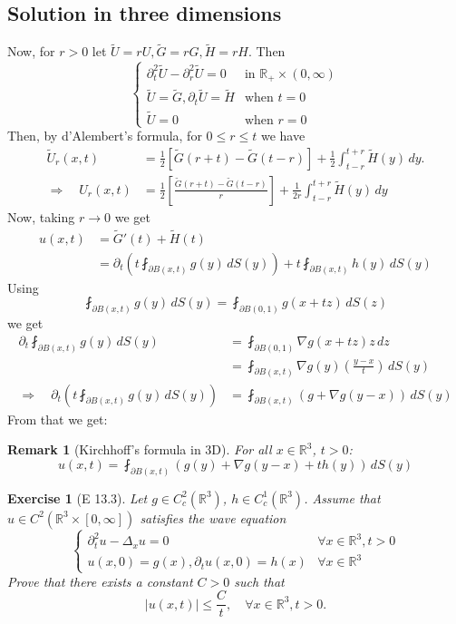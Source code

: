 \documentclass{report}
\theoremstyle{tommy}
\newtheorem{rem}[defn]{Remark}
\newtheorem{ex}[defn]{Exercise}
\begin{document}
  \subsection{Solution in three dimensions}
  Now, for \(r > 0\) let \(\tilde U = r U, \tilde G = rG, \tilde H = rH\). Then 
  \[\begin{cases}
    \partial_t^2 \tilde U - \partial_r^2 \tilde U = 0 & \text{in } \mathbb{R}_+ \times (0,\infty) \\
    \tilde U = \tilde G, \partial_t \tilde U = \tilde H &\text{when } t = 0 \\
    \tilde U = 0 &\text{when } r = 0
  \end{cases}\]
  Then, by d'Alembert's formula, for \(0 \le r \le t\) we have
  \begin{align*}
    \tilde U_r(x,t) &= \frac{1}{2} \left[\tilde G(r+t) - \tilde G(t-r)\right] + \frac{1}{2} \int_{t-r}^{t+r} \tilde H(y) \, dy. \\
    \Rightarrow \quad U_r(x,t) &= \frac{1}{2} \left[\frac{\tilde G(r+t) - \tilde G(t-r)}{r}\right]  + \frac{1}{2r} \int_{t-r}^{t+r} \tilde H(y) \, dy 
  \end{align*}
  Now, taking \(r \to 0\) we get 
  \begin{align*}
    u(x,t) &= \tilde G'(t) + \tilde H(t) \\
    &= \partial_t \left(t \fint_{\partial B(x,t)} g(y) \, dS(y) \right) + t \fint_{\partial B(x,t)} h(y) \, dS(y)
  \end{align*}
  Using 
  \[\fint_{\partial B(x,t)} g(y) \, dS(y) = \fint_{\partial B(0,1)} g(x+tz) \, dS(z)\]
  we get 
  \begin{align*}
    \partial_t \fint_{\partial B(x,t)} g(y) \, dS(y) &= \fint_{\partial B(0,1)} \nabla g(x+tz) z \, dz \\
    &= \fint_{\partial B(x,t)} \nabla g(y) \left(\frac{y-x}{t}\right) \, dS(y) \\
    \Rightarrow \quad \partial_t \left(t \fint_{\partial B(x,t)} g(y) \, dS(y)\right) &= \fint_{\partial B(x,t)} \left(g + \nabla g (y-x)\right) \, dS(y)
  \end{align*}
  From that we get:

  \begin{rem}[Kirchhoff's formula in 3D]
    For all \(x \in \mathbb{R}^3\), \(t > 0\):
    \[u(x,t) = \fint_{\partial B(x,t)} \left(g(y) + \nabla g (y-x) + th(y)\right)\, dS(y)\]
  \end{rem}

  \begin{ex}[E 13.3]
    Let \(g \in C_c^2(\mathbb{R}^3)\), \(h \in C_c^1(\mathbb{R}^3)\). Assume that \(u \in C^2(\mathbb{R}^3 \times [0,\infty])\) satisfies the wave equation 
    \[\begin{cases}
      \partial_t^2 u - \Delta_x u = 0 &\forall x \in \mathbb{R}^3, t > 0 \\
      u(x,0) = g(x), \partial_tu(x,0) = h(x) &\forall x \in \mathbb{R}^3
    \end{cases}\]
    Prove that there exists a constant \(C > 0\) such that 
    \[|u(x,t)| \le \frac{C}{t}, \quad \forall x \in \mathbb{R}^3, t > 0.\]
  \end{ex}
\end{document}
